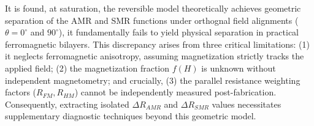 \documentclass[11pt,a4paper]{article}
\begin{document}
It is found, at saturation, the reversible model theoretically achieves geometric separation of the AMR and SMR functions under orthognal field alignments ($\theta=0^{\circ}$ and $90^{\circ}$), it fundamentally fails to yield physical separation in practical ferromagnetic bilayers. This discrepancy arises from three critical limitations: (1) it neglects ferromagnetic anisotropy, assuming magnetization strictly tracks the applied field; (2) the magnetization fraction $f(H)$ is unknown without independent magnetometry; and crucially, (3) the parallel resistance weighting factors ($R_{FM}, R_{HM}$) cannot be independently measured post-fabrication. Consequently, extracting isolated $\Delta R_{AMR}$ and $\Delta R_{SMR}$ values necessitates supplementary diagnostic techniques beyond this geometric model.
\\
\end{document}
